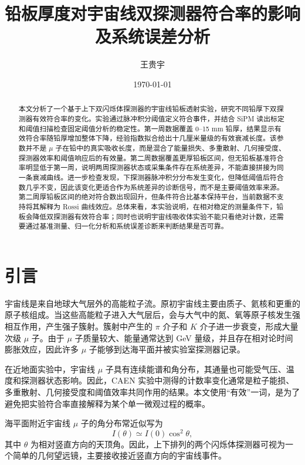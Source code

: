\documentclass[aps,prl,twocolumn,superscriptaddress,nofootinbib]{revtex4-2}
\begin{document}
\title{铅板厚度对宇宙线双探测器符合率的影响及系统误差分析}

\author{王贵宇}

\date{\today}

\begin{abstract}
本文分析了一个基于上下双闪烁体探测器的宇宙线铅板透射实验，研究不同铅厚下双探测器有效符合率的变化。实验通过脉冲积分阈值定义符合事件，并结合 SiPM 读出标定和阈值扫描检查固定阈值分析的稳定性。第一周数据覆盖 0--15 mm 铅厚，结果显示有效符合率随铅厚增加整体下降，经验指数拟合给出十几厘米量级的有效衰减长度。该参数并不是 $\mu$ 子在铅中的真实吸收长度，而是混合了能量损失、多重散射、几何接受度、探测器效率和阈值响应后的有效量。第二周数据覆盖更厚铅板区间，但无铅板基准符合率明显低于第一周，说明两周探测器状态或采集条件存在系统差异，不能直接拼接为同一条衰减曲线。进一步检查发现，下探测器脉冲积分分布发生变化，但降低阈值后符合数几乎不变，因此该变化更适合作为系统差异的诊断信号，而不是主要阈值效率来源。第二周厚铅板区间的绝对符合数出现回升，但条件符合比基本保持平台，当前数据不支持将其解释为 Rossi 曲线效应。总体来看，本实验说明，在相对稳定的测量条件下，铅板会降低双探测器有效符合率；同时也说明宇宙线吸收体实验不能只看绝对计数，还需要通过基准测量、归一化分析和系统误差诊断来判断结果是否可靠。
\end{abstract}

\maketitle

\section{引言}

宇宙线是来自地球大气层外的高能粒子流。原初宇宙线主要由质子、氦核和更重的原子核组成。当这些高能粒子进入大气层后，会与大气中的氮、氧等原子核发生强相互作用，产生强子簇射。簇射中产生的 $\pi$ 介子和 $K$ 介子进一步衰变，形成大量次级 $\mu$ 子。由于 $\mu$ 子质量较大、能量通常达到 GeV 量级，并且存在相对论时间膨胀效应，因此许多 $\mu$ 子能够到达海平面并被实验室探测器记录。

在近地面实验中，宇宙线 $\mu$ 子具有连续能谱和角分布，其通量也可能受气压、温度和探测器状态影响。因此，CAEN 实验中测得的计数率变化通常是粒子能损、多重散射、几何接受度和阈值效率共同作用的结果。本文使用“有效”一词，是为了避免把实验符合率直接解释为某个单一微观过程的概率。

海平面附近宇宙线 $\mu$ 子的角分布常近似写为
\begin{equation}
I(\theta)\simeq I(0)\cos^2\theta ,
\end{equation}
其中 $\theta$ 为相对竖直方向的天顶角。因此，上下排列的两个闪烁体探测器可视为一个简单的几何望远镜，主要接收接近竖直方向的宇宙线事件。
\end{document}
